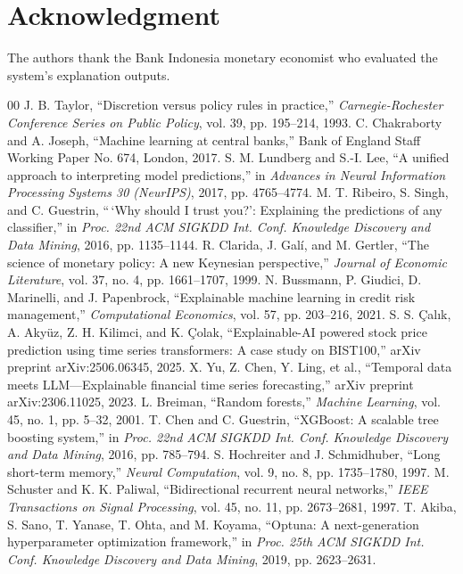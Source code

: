 \documentclass[conference]{IEEEtran}
\begin{document}
\section*{Acknowledgment}
The authors thank the Bank Indonesia monetary economist who evaluated the system's explanation outputs.

\begin{thebibliography}{00}
 J. B. Taylor, ``Discretion versus policy rules in practice,'' \emph{Carnegie-Rochester Conference Series on Public Policy}, vol. 39, pp. 195--214, 1993.
 C. Chakraborty and A. Joseph, ``Machine learning at central banks,'' Bank of England Staff Working Paper No. 674, London, 2017.
 S. M. Lundberg and S.-I. Lee, ``A unified approach to interpreting model predictions,'' in \emph{Advances in Neural Information Processing Systems 30 (NeurIPS)}, 2017, pp. 4765--4774.
 M. T. Ribeiro, S. Singh, and C. Guestrin, ``\,`Why should I trust you?': Explaining the predictions of any classifier,'' in \emph{Proc. 22nd ACM SIGKDD Int. Conf. Knowledge Discovery and Data Mining}, 2016, pp. 1135--1144.
 R. Clarida, J. Gal\'{i}, and M. Gertler, ``The science of monetary policy: A new Keynesian perspective,'' \emph{Journal of Economic Literature}, vol. 37, no. 4, pp. 1661--1707, 1999.
 N. Bussmann, P. Giudici, D. Marinelli, and J. Papenbrock, ``Explainable machine learning in credit risk management,'' \emph{Computational Economics}, vol. 57, pp. 203--216, 2021.
 S. S. \c{C}al{\i}k, A. Aky\"{u}z, Z. H. Kilimci, and K. \c{C}olak, ``Explainable-AI powered stock price prediction using time series transformers: A case study on BIST100,'' arXiv preprint arXiv:2506.06345, 2025.
 X. Yu, Z. Chen, Y. Ling, et al., ``Temporal data meets LLM---Explainable financial time series forecasting,'' arXiv preprint arXiv:2306.11025, 2023.
 L. Breiman, ``Random forests,'' \emph{Machine Learning}, vol. 45, no. 1, pp. 5--32, 2001.
 T. Chen and C. Guestrin, ``XGBoost: A scalable tree boosting system,'' in \emph{Proc. 22nd ACM SIGKDD Int. Conf. Knowledge Discovery and Data Mining}, 2016, pp. 785--794.
 S. Hochreiter and J. Schmidhuber, ``Long short-term memory,'' \emph{Neural Computation}, vol. 9, no. 8, pp. 1735--1780, 1997.
 M. Schuster and K. K. Paliwal, ``Bidirectional recurrent neural networks,'' \emph{IEEE Transactions on Signal Processing}, vol. 45, no. 11, pp. 2673--2681, 1997.
 T. Akiba, S. Sano, T. Yanase, T. Ohta, and M. Koyama, ``Optuna: A next-generation hyperparameter optimization framework,'' in \emph{Proc. 25th ACM SIGKDD Int. Conf. Knowledge Discovery and Data Mining}, 2019, pp. 2623--2631.
\end{thebibliography}
\end{document}
